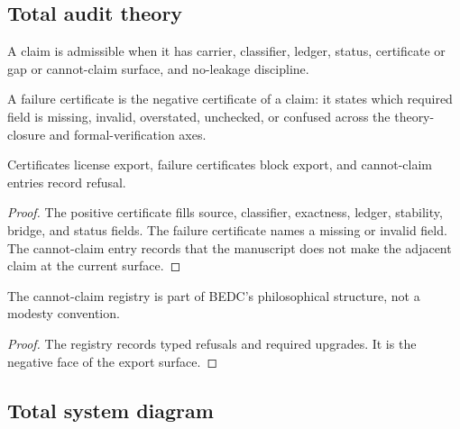 \subsection{Total audit theory}
\label{subsec:philosophy-total-audit}

\begin{definition}
\label{def:philosophy-admissible-claim-total}
A claim is admissible when it has carrier, classifier, ledger, status,
certificate or gap or cannot-claim surface, and no-leakage discipline.
\end{definition}

\begin{definition}
\label{def:philosophy-failure-certificate-total}
A failure certificate is the negative certificate of a claim: it states
which required field is missing, invalid, overstated, unchecked, or
confused across the theory-closure and formal-verification axes.
\end{definition}

\begin{theorem}
\label{thm:philosophy-positive-negative-certificates-total}
Certificates license export, failure certificates block export, and
cannot-claim entries record refusal.
\end{theorem}
\begin{proof}
The positive certificate fills source, classifier, exactness, ledger,
stability, bridge, and status fields. The failure certificate names a
missing or invalid field. The cannot-claim entry records that the
manuscript does not make the adjacent claim at the current surface.
\end{proof}

\begin{corollary}
\label{cor:philosophy-cannot-claim-negative-knowledge-total}
The cannot-claim registry is part of BEDC's philosophical structure,
not a modesty convention.
\end{corollary}
\begin{proof}
The registry records typed refusals and required upgrades. It is the
negative face of the export surface.
\end{proof}

\subsection{Total system diagram}
\label{subsec:philosophy-total-system-diagram}


